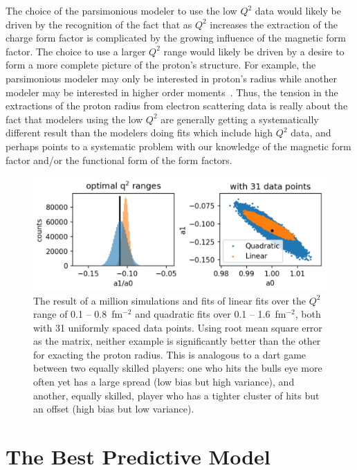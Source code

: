 \documentclass[10pt,aps,prc,twocolumn]{revtex4-1}
\begin{document}
The choice of the parsimonious modeler to use the low $Q^2$ data would likely be 
driven by the recognition of the fact that as $Q^2$ increases
the extraction of the charge form factor is complicated by the growing influence of the magnetic 
form factor.   The choice to use a larger $Q^2$ range would likely be driven by a desire 
to form a more complete picture of the proton's structure.
For example, the parsimonious modeler may only be interested in proton's radius while another 
modeler may be interested in higher order moments~\cite{Alarcon:2017lhg}.
Thus, the tension in the extractions of the proton radius from electron scattering data is really 
about the fact that modelers using the low $Q^2$ are generally getting a systematically different 
result than the modelers doing fits which include high $Q^2$ data, and perhaps points to a systematic 
problem with our knowledge of the magnetic form factor and/or the functional form of the
form factors.

\begin{figure}
\includegraphics[width=\columnwidth]{Figure/zoptimized.png}
\caption{The result of a million simulations and fits of linear fits over the $Q^2$ range 
of 0.1 -- 0.8~fm$^{-2}$ and quadratic fits over 0.1 -- 1.6~fm$^{-2}$, both with 31 uniformly 
spaced data points.    Using root mean
square error as the matrix, neither example is significantly better than the other for exacting the proton
radius.   This is analogous to a dart game between two equally skilled players: one who hits the bulls eye more 
often yet has a large spread (low bias but high variance), and another, equally skilled, player who has a 
tighter cluster of hits but an offset (high bias but low variance).}
\label{zoptimized}
\end{figure}

\section{The Best Predictive Model}
\end{document}

